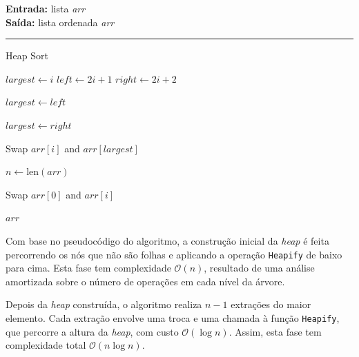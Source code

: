 \documentclass[conference]{IEEEtran}
\begin{document}
\begin{algorithm}[H]
    \raggedright
    \vspace{.1em}
    \textbf{Entrada:} lista \textit{arr} \\
    \textbf{Saída:} lista ordenada \textit{arr} \\
    \vspace{.5em}
    \hrule 
    \caption{Heap Sort}
    \begin{algorithmic}[1]
            \State $largest \gets i$
            \State $left \gets 2i + 1$
            \State $right \gets 2i + 2$
    
                \State $largest \gets left$
            \EndIf
    
                \State $largest \gets right$
            \EndIf
    
                \State Swap $arr[i]$ and $arr[largest]$
                \State {}
            \EndIf
        \EndFunction
    
            \State $n \gets \text{len}(arr)$
    
                \State {}
            \EndFor
    
                \State Swap $arr[0]$ and $arr[i]$
                \State {}
            \EndFor
    
            \State \Return $arr$
        \EndFunction
    
        \State {}
    \end{algorithmic}
\end{algorithm}

Com base no pseudocódigo do algoritmo, a construção inicial da \textit{heap} é feita percorrendo os nós que não são folhas e aplicando a operação \texttt{Heapify} de baixo para cima. Esta fase tem complexidade \(\mathcal{O}(n)\), resultado de uma análise amortizada sobre o número de operações em cada nível da árvore.

Depois da \textit{heap} construída, o algoritmo realiza \(n - 1\) extrações do maior elemento. Cada extração envolve uma troca e uma chamada à função \texttt{Heapify}, que percorre a altura da \textit{heap}, com custo \(\mathcal{O}(\log n)\). Assim, esta fase tem complexidade total \(\mathcal{O}(n \log n)\).
\end{document}
